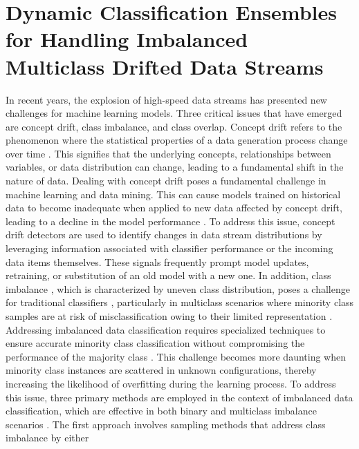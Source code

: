 
\chapter{Dynamic Classification Ensembles for Handling Imbalanced
  Multiclass Drifted Data Streams}
  \label{chapter:4_Imbalanced_Multiclass}
  
  In recent years, the explosion of high-speed data streams has presented new challenges for machine learning models. Three critical
  issues that have emerged are concept drift, class imbalance, and class overlap. Concept drift refers to the phenomenon where the
  statistical properties of a data generation process change over time \cite{yang2021concept, dong2019multistream}. This signifies that the underlying concepts, relationships
  between variables, or data distribution can change, leading to a fundamental shift in the nature of data. Dealing with concept drift
  poses a fundamental challenge in machine learning and data mining. This can cause models trained on historical data to become
  inadequate when applied to new data affected by concept drift, leading to a decline in the model performance \cite{dong2019multistream}. To address this issue,
  concept drift detectors are used to identify changes in data stream distributions by leveraging information associated with classifier
  performance or the incoming data items themselves. These signals frequently prompt model updates, retraining, or substitution of an
  old model with a new one.
  In addition, class imbalance \cite{dong2019multistream, pan2009survey}, which is characterized by uneven class distribution, poses a challenge for traditional classifiers
  \cite{zhuang2020comprehensive}, particularly in multiclass scenarios where minority class samples are at risk of misclassification owing to their limited representation \cite{wang2018systematic}. Addressing imbalanced data classification requires specialized techniques to ensure accurate minority class classification without compromising the performance of the majority class \cite{sun2009classification, charte2015addressing, charte2015mlsmote}. This challenge becomes more daunting when minority class instances are scattered in unknown configurations, thereby increasing the likelihood of overfitting during the learning process. To
  address this issue, three primary methods are employed in the context of imbalanced data classification, which are effective in both
  binary and multiclass imbalance scenarios \cite{daniels2017addressing}. The first approach involves sampling methods that address class imbalance by either
